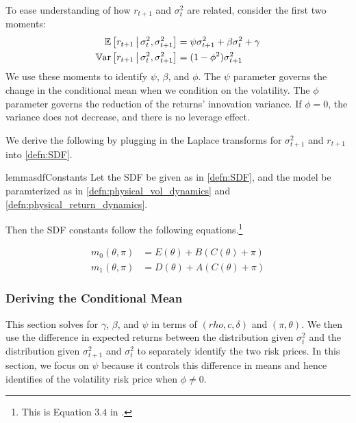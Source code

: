 \documentclass[11pt, letterpaper, twoside]{article}
\begin{document}
To ease understanding of how $r_{t+1}$ and $\sigma^2_t$ are related, consider the first two moments:
%
\begin{align}
 \label{eqn:rtn_cond_mean}
 \operatorname{\mathbb{E}}\left[r_{t+1} \,\middle\vert\, \sigma^2_t, \sigma^2_{t+1}\right] &= \psi \sigma^2_{t+1} + \beta \sigma^2_t +
 \gamma \\
 \label{eqn:rtn_cond_vol}
 \operatorname{\mathbb{V}ar}\left[r_{t+1} \,\middle\vert\, \sigma^2_t, \sigma^2_{t+1}\right] &= (1 - \phi^2) \sigma^2_{t+1} 
\end{align}
%
We use these moments  to identify $\psi$, $\beta$, and $\phi$.  The $\psi$ parameter governs the change in the conditional mean when we condition on the volatility. The $\phi$ parameter governs the reduction of the returns' innovation variance.  If $\phi=0$, the variance does not decrease, and there is no leverage effect.

We derive the following by plugging in the Laplace transforms for $\sigma^2_{t+1}$ and $r_{t+1}$ into \cref{defn:SDF}.

\begin{restatable}{lemma}{sdfConstants}
 \label{lemma:characterizing_sdf_integration_constants}
 Let the SDF be given as in \cref{defn:SDF}, and the model be paramterized as in
 \cref{defn:physical_vol_dynamics} and \cref{defn:physical_return_dynamics}.

 Then the SDF constants follow the following equations.\footnote{This is Equation $3.4$ in
 \textcite[3.4]{han2018leverage}.}

 \begin{align}
  \label{eqn:sdf_functions_vs_physical_functions}
  m_0(\theta, \pi) &= E(\theta) + B(C(\theta) + \pi) \\
  m_1(\theta, \pi) &= D(\theta) + A(C(\theta) + \pi) \nonumber
 \end{align}

\end{restatable}


\subsubsection{Deriving the Conditional Mean}\label{sec:deriving_conditional_mean}


This section solves for $\gamma$, $\beta$, and $\psi$ in terms of $(rho, c, \delta)$ and $(\pi, \theta)$. We then use the difference in expected returns between the distribution given $\sigma^2_t$ and the distribution given $\sigma^2_{t+1}$ and $\sigma^2_t$ to separately identify the two risk prices. In this section, we focus on $\psi$ because it controls this difference in means and hence identifies of the volatility risk price when $\phi \neq 0$.
\end{document}
